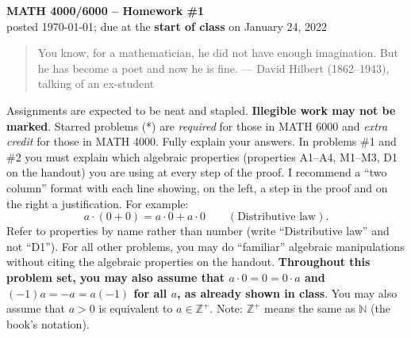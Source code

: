 \documentclass[11pt]{article}
\def\Z{\mathbb{Z}}
\def\N{\mathbb{N}}
\theoremstyle{plain}
\theoremstyle{remark}
\begin{document}
\thispagestyle{empty} \begin{center} {\textbf{MATH 4000/6000 --
Homework \#1}\\ posted \today; due at the \textbf{start of class} on January 24, 2022}
\end{center}

\begin{quote} {\scriptsize You know, for a mathematician, he did not have enough imagination. But he has become a poet and now he is fine. --- David Hilbert (1862--1943), talking of an ex-student}
\end{quote}

\noindent Assignments are expected to be neat and stapled. \textbf{Illegible work may not be marked}. Starred problems (*) are \emph{required} for those in MATH 6000 and \emph{extra credit} for those in MATH 4000.
\vskip 0.1in
\noindent Fully explain your answers. In problems \#1 and \#2 you must explain which algebraic properties (properties A1--A4, M1--M3, D1 on the handout) you are using at every step of the proof. I recommend a ``two column'' format with each line showing, on the left, a step in the proof and on the right a justification. For example:
\[ a\cdot (0+0) = a\cdot 0 + a\cdot 0 \qquad (\text{Distributive law}). \]
Refer to properties by name rather than number (write ``Distributive law'' and not ``D1'').
\vskip 0.1in
\noindent For all other problems, you may do ``familiar'' algebraic manipulations without citing the algebraic properties on the handout. \textbf{Throughout this problem set, you may also assume that $a\cdot 0=0= 0\cdot a$ and $(-1)a=-a = a(-1)$ for all $a$, as already shown in class}. You may also assume that $a>0$ is equivalent to $a \in \Z^{+}$.
\vskip 0.1in
\noindent Note: $\Z^{+}$ means the same as $\N$ (the book's notation).
\end{document}
